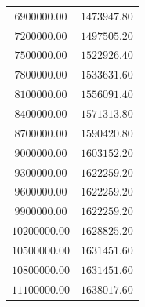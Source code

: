 \documentclass{article}
\begin{document}
\begin{longtable}{cc}
$6900000.00$ & $1473947.80$\\
$7200000.00$ & $1497505.20$\\
$7500000.00$ & $1522926.40$\\
$7800000.00$ & $1533631.60$\\
$8100000.00$ & $1556091.40$\\
$8400000.00$ & $1571313.80$\\
$8700000.00$ & $1590420.80$\\
$9000000.00$ & $1603152.20$\\
$9300000.00$ & $1622259.20$\\
$9600000.00$ & $1622259.20$\\
$9900000.00$ & $1622259.20$\\
$10200000.00$ & $1628825.20$\\
$10500000.00$ & $1631451.60$\\
$10800000.00$ & $1631451.60$\\
$11100000.00$ & $1638017.60$\\
\bottomrule
\end{longtable}

\newpage



\end{document}
